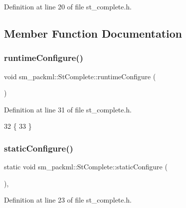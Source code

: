 Definition at line 20 of file st\+\_\+complete.\+h.



\subsection{Member Function Documentation}
\mbox{\label{structsm__packml_1_1StComplete_af6884149d83d202713c31c0aa85fa9e2}} 
\subsubsection{\texorpdfstring{runtime\+Configure()}{runtimeConfigure()}}
{\footnotesize\ttfamily void sm\+\_\+packml\+::\+St\+Complete\+::runtime\+Configure (\begin{DoxyParamCaption}{ }\end{DoxyParamCaption})\hspace{0.3cm}{\ttfamily [inline]}}



Definition at line 31 of file st\+\_\+complete.\+h.


\begin{DoxyCode}
32     \{
33     \}
\end{DoxyCode}
\mbox{\label{structsm__packml_1_1StComplete_a6d671966b0f05fc72d1662054a32ecd3}} 
\subsubsection{\texorpdfstring{static\+Configure()}{staticConfigure()}}
{\footnotesize\ttfamily static void sm\+\_\+packml\+::\+St\+Complete\+::static\+Configure (\begin{DoxyParamCaption}{ }\end{DoxyParamCaption})\hspace{0.3cm}{\ttfamily [inline]}, {\ttfamily [static]}}



Definition at line 23 of file st\+\_\+complete.\+h.


